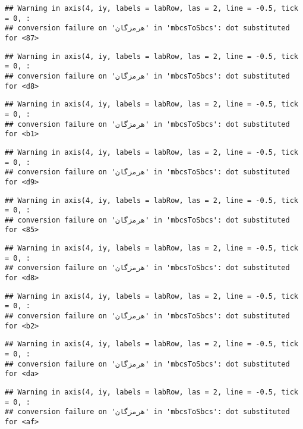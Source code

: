 \documentclass[
]{article}
\begin{document}
\begin{verbatim}
## Warning in axis(4, iy, labels = labRow, las = 2, line = -0.5, tick = 0, :
## conversion failure on 'هرمزگان' in 'mbcsToSbcs': dot substituted for <87>
\end{verbatim}

\begin{verbatim}
## Warning in axis(4, iy, labels = labRow, las = 2, line = -0.5, tick = 0, :
## conversion failure on 'هرمزگان' in 'mbcsToSbcs': dot substituted for <d8>
\end{verbatim}

\begin{verbatim}
## Warning in axis(4, iy, labels = labRow, las = 2, line = -0.5, tick = 0, :
## conversion failure on 'هرمزگان' in 'mbcsToSbcs': dot substituted for <b1>
\end{verbatim}

\begin{verbatim}
## Warning in axis(4, iy, labels = labRow, las = 2, line = -0.5, tick = 0, :
## conversion failure on 'هرمزگان' in 'mbcsToSbcs': dot substituted for <d9>
\end{verbatim}

\begin{verbatim}
## Warning in axis(4, iy, labels = labRow, las = 2, line = -0.5, tick = 0, :
## conversion failure on 'هرمزگان' in 'mbcsToSbcs': dot substituted for <85>
\end{verbatim}

\begin{verbatim}
## Warning in axis(4, iy, labels = labRow, las = 2, line = -0.5, tick = 0, :
## conversion failure on 'هرمزگان' in 'mbcsToSbcs': dot substituted for <d8>
\end{verbatim}

\begin{verbatim}
## Warning in axis(4, iy, labels = labRow, las = 2, line = -0.5, tick = 0, :
## conversion failure on 'هرمزگان' in 'mbcsToSbcs': dot substituted for <b2>
\end{verbatim}

\begin{verbatim}
## Warning in axis(4, iy, labels = labRow, las = 2, line = -0.5, tick = 0, :
## conversion failure on 'هرمزگان' in 'mbcsToSbcs': dot substituted for <da>
\end{verbatim}

\begin{verbatim}
## Warning in axis(4, iy, labels = labRow, las = 2, line = -0.5, tick = 0, :
## conversion failure on 'هرمزگان' in 'mbcsToSbcs': dot substituted for <af>
\end{verbatim}
\end{document}
